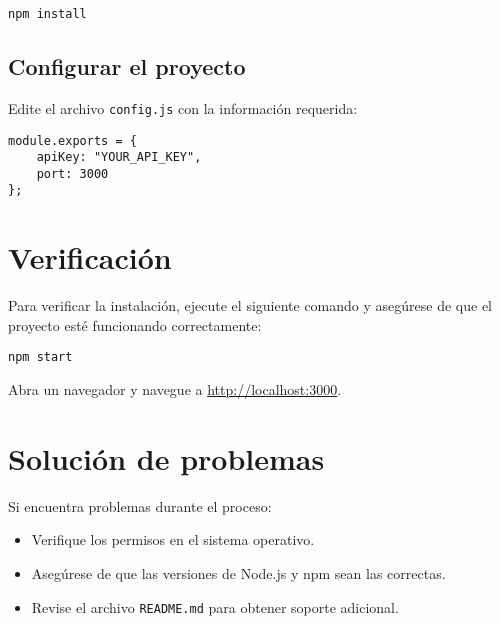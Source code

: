 \documentclass[11pt]{article}
\begin{document}
    \begin{verbatim}
npm install
    \end{verbatim}

    \subsection{Configurar el proyecto}
    Edite el archivo \texttt{config.js} con la información requerida:
    \begin{verbatim}
module.exports = {
    apiKey: "YOUR_API_KEY",
    port: 3000
};
    \end{verbatim}

    \section{Verificación}
    Para verificar la instalación, ejecute el siguiente comando y asegúrese de que el proyecto esté funcionando correctamente:

    \begin{verbatim}
npm start
    \end{verbatim}

    Abra un navegador y navegue a \url{http://localhost:3000}.

    \section{Solución de problemas}
    Si encuentra problemas durante el proceso:
    \begin{itemize}
        \item Verifique los permisos en el sistema operativo.
        \item Asegúrese de que las versiones de Node.js y npm sean las correctas.
        \item Revise el archivo \texttt{README.md} para obtener soporte adicional.
    \end{itemize}

    
    
\end{document}
